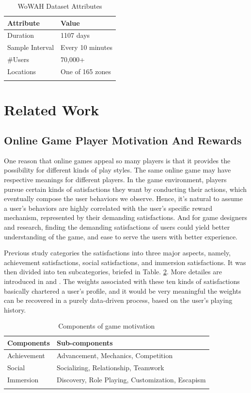 \documentclass{sigchi}
\begin{document}
\begin{table}
    \caption{WoWAH Dataset Attributes}
    \begin{tabularx}{\textwidth}{lX}
        Attribute & Value \\
        \midrule
        Duration & 1107 days \\
        Sample Interval & Every 10 minutes \\
        \#Users & 70,000+ \\
        Locations & One of 165 zones \\
        \label{tbl:wowah}
    \end{tabularx}
\end{table}

\section{Related Work}

\subsection{Online Game Player Motivation And Rewards}

One reason that online games appeal so many players is that it provides the possibility for different kinds of play styles. 
The same online game may have respective meanings for different players. 
In the game environment, players pursue certain kinds of satisfactions they want by conducting their actions, which eventually compose the user behaviors we observe. 
Hence, it's natural to assume a user's behaviors are highly correlated with the user's specific reward mechanism, represented by their demanding satisfactions. 
And for game designers and research, finding the demanding satisfactions of users could yield better understanding of the game, and ease to serve the users with better experience. 

Previous study categories the satisfactions into three major aspects, namely, achievement satisfactions, social satisfactions, and immersion satisfactions. It was then divided into ten subcategories, briefed in Table. \ref{tbl:components}. More detailes are introduced in \cite{yee2006motivations} and \cite{yee2006demographics}. The weights associated with these ten kinds of satisfactions basically chartered a user's profile, and it would be very meaningful the weights can be recovered in a purely data-driven process, based on the user's playing history.

\begin{table}
\caption{Components of game motivation}
\begin{tabularx}{\textwidth}{lX}
    Components & Sub-components \\
    \midrule
    Achievement & Advancement, Mechanics, Competition \\
    Social & Socializing, Relationship, Teamwork \\
    Immersion & Discovery, Role Playing, Customization, Escapism \\
    \label{tbl:components}
\end{tabularx}
\end{table}
\end{document}
